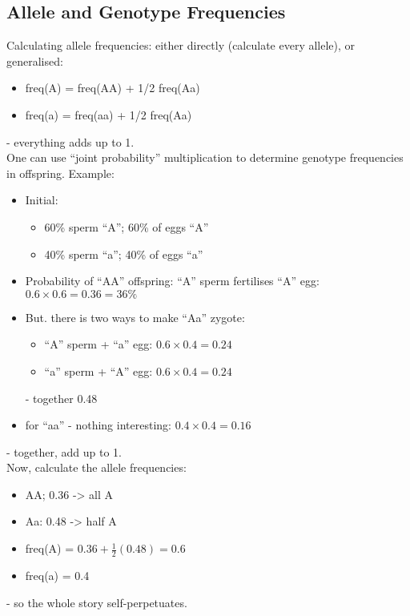 \documentclass{scrartcl}
\begin{document}
\subsection{Allele and Genotype Frequencies}
\label{sec:06-1-1}
Calculating allele frequencies: either directly (calculate every allele), or generalised: 
\begin{itemize}
\item freq(A) = freq(AA) + 1/2 freq(Aa)
\item freq(a) = freq(aa) + 1/2 freq(Aa)
\end{itemize}
- everything adds up to 1.\\
One can use ``joint probability'' multiplication to determine genotype frequencies in offspring. Example:
\begin{itemize}
\item Initial:
  \begin{itemize}
  \item 60\% sperm ``A''; 60\% of eggs ``A''
  \item 40\% sperm ``a''; 40\% of eggs ``a''
  \end{itemize}
\item Probability of ``AA'' offspring: ``A'' sperm fertilises ``A'' egg: $0.6 \times 0.6 = 0.36 = 36\%$ 
\item But. there is two ways to make ``Aa'' zygote:
  \begin{itemize}
  \item ``A'' sperm + ``a'' egg: $0.6 \times 0.4 = 0.24$
  \item ``a'' sperm + ``A'' egg: $0.6 \times 0.4 = 0.24$
  \end{itemize}
- together 0.48
\item for ``aa'' - nothing interesting: $0.4 \times 0.4 = 0.16$
\end{itemize}
- together, add up to 1.\\
Now, calculate the allele frequencies:\\
\begin{itemize}
\item AA; 0.36 -> all A
\item Aa: 0.48 -> half A
\item freq(A) = $0.36 + \frac12(0.48) = 0.6$
\item freq(a) = 0.4
\end{itemize}
- so the whole story self-perpetuates.

\end{document}
